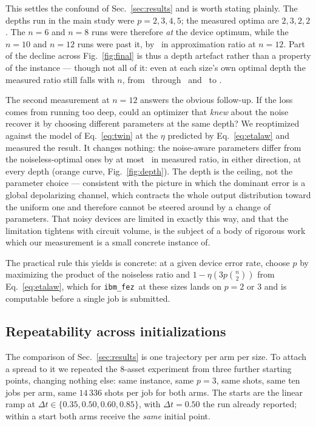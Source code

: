 \documentclass[aps,prx,preprint,superscriptaddress,nofootinbib,longbibliography]{revtex4-2}
\newcommand{\ibmfez}{\texttt{ibm\_fez}}
\begin{document}
This settles the confound of Sec.~\ref{sec:results} and is worth stating plainly. The depths run
in the main study were $p = 2, 3, 4, 5$; the measured optima are $2, 3, 2, 2$. The $n=6$ and $n=8$
runs were therefore \emph{at} the device optimum, while the $n=10$ and $n=12$ runs were past it,
by \depthgaintwelve\ in approximation ratio at $n=12$. Part of the decline across
Fig.~\ref{fig:final} is thus a depth artefact rather than a property of the instance --- though
not all of it: even at each size's own optimal depth the measured ratio still falls with $n$,
from \depthbestsix\ through \depthbesteight\ and \depthbestten\ to \depthbesttwelve.

The second measurement at $n=12$ answers the obvious follow-up. If the loss comes from running
too deep, could an optimizer that \emph{knew} about the noise recover it by choosing different
parameters at the same depth? We reoptimized against the model of Eq.~\eqref{eq:twin} at the
$\eta$ predicted by Eq.~\eqref{eq:etalaw} and measured the result. It changes nothing: the
noise-aware parameters differ from the noiseless-optimal ones by at most \noiseawaremax\ in
measured ratio, in either direction, at every depth (orange curve, Fig.~\ref{fig:depth}). The
depth is the ceiling, not the parameter choice --- consistent with the picture in which the dominant
error is a global depolarizing channel, which contracts the whole output distribution toward
the uniform one and therefore cannot be steered around by a change of parameters. That noisy
devices are limited in exactly this way, and that the limitation tightens with circuit volume,
is the subject of a body of rigorous
work~\cite{stilckfranca2021limitations,wang2021noisebp} which our measurement is a small
concrete instance of.

The practical rule this yields is concrete: at a given device error rate, choose $p$ by
maximizing the product of the noiseless ratio and $1-\eta(3p\binom{n}{2})$ from
Eq.~\eqref{eq:etalaw}, which for \ibmfez\ at these sizes lands on $p = 2$ or $3$ and is
computable before a single job is submitted.

\subsection{Repeatability across initializations}
\label{sec:replicates}

The comparison of Sec.~\ref{sec:results} is one trajectory per arm per size. To attach a spread to
it we repeated the $8$-asset experiment from three further starting points, changing nothing else:
same instance, same $p=3$, same shots, same ten jobs per arm, same $14\,336$ shots per job for both
arms. The starts are the linear ramp at $\Delta t \in \{0.35, 0.50, 0.60, 0.85\}$, with
$\Delta t = 0.50$ the run already reported; within a start both arms receive the \emph{same}
initial point.
\end{document}
